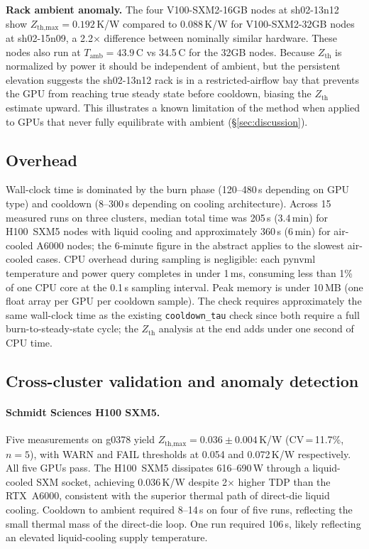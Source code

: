 \documentclass[conference]{IEEEtran}
\begin{document}
\textbf{Rack ambient anomaly.}
The four V100-SXM2-16GB nodes at sh02-13n12 show $Z_\text{th,max} =
0.192$\,K/W compared to 0.088\,K/W for V100-SXM2-32GB nodes at
sh02-15n09, a 2.2$\times$ difference between nominally similar
hardware.
These nodes also run at $T_\text{amb} = 43.9$\,\textdegree C vs
34.5\,\textdegree C for the 32GB nodes.
Because $Z_\text{th}$ is normalized by power it should be
independent of ambient, but the persistent elevation suggests the
sh02-13n12 rack is in a restricted-airflow bay that prevents the
GPU from reaching true steady state before cooldown, biasing the
$Z_\text{th}$ estimate upward.
This illustrates a known limitation of the method when applied to
GPUs that never fully equilibrate with ambient
(\S\ref{sec:discussion}).

\subsection{Overhead}
Wall-clock time is dominated by the burn phase (120--480\,s
depending on GPU type) and cooldown (8--300\,s depending on cooling
architecture).
Across 15 measured runs on three clusters, median total time was
205\,s (3.4\,min) for H100~SXM5 nodes with liquid cooling and
approximately 360\,s (6\,min) for air-cooled A6000 nodes; the
6-minute figure in the abstract applies to the slowest air-cooled
cases.
CPU overhead during sampling is negligible: each pynvml temperature
and power query completes in under 1\,ms, consuming less than 1\% of
one CPU core at the 0.1\,s sampling interval.
Peak memory is under 10\,MB (one float array per GPU per cooldown
sample).
The check requires approximately the same wall-clock time as the
existing \texttt{cooldown\_tau} check since both require a full
burn-to-steady-state cycle; the $Z_\text{th}$ analysis at the end
adds under one second of CPU time.

\subsection{Cross-cluster validation and anomaly detection}
\label{sec:xcluster}

\paragraph{Schmidt Sciences H100 SXM5.}
Five measurements on g0378 yield $Z_\text{th,max} = 0.036 \pm 0.004$\,K/W
(CV\,=\,11.7\%, $n{=}5$), with WARN and FAIL thresholds at 0.054 and
0.072\,K/W respectively.
All five GPUs pass.
The H100~SXM5 dissipates 616--690\,W through a liquid-cooled SXM socket,
achieving 0.036\,K/W despite 2$\times$ higher TDP than the RTX~A6000,
consistent with the superior thermal path of direct-die liquid cooling.
Cooldown to ambient required 8--14\,s on four of five runs, reflecting the
small thermal mass of the direct-die loop. One run required 106\,s,
likely reflecting an elevated liquid-cooling supply temperature.
\end{document}
